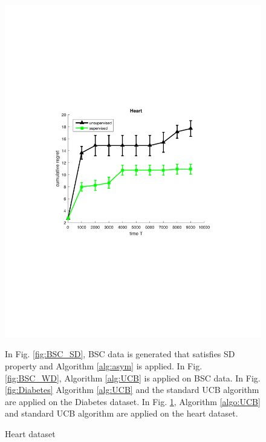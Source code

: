 \begin{figure}[!bt]
\begin{minipage}{4cm}
		\includegraphics[scale=0.3]{../Simulations/Figures/Heart_WD1}
		\label{fig:Heart}
		\vspace{-.5cm}
		\caption{Heart dataset}
	\end{minipage}
	\vspace{.2cm}

\noindent
In Fig. \ref{fig:BSC_SD}, BSC data is generated that satisfies SD property and Algorithm \ref{alg:asym} is applied. In  Fig. \ref{fig:BSC_WD}, Algorithm \ref{alg:UCB} is applied on BSC data. In Fig. \ref{fig:Diabetes} Algorithm \ref{alg:UCB} and the standard UCB algorithm are applied on the Diabetes dataset. In Fig. \ref{fig:Heart}, Algorithm \ref{algo:UCB} and standard UCB algorithm are applied on the heart dataset. 
\end{figure}
%
